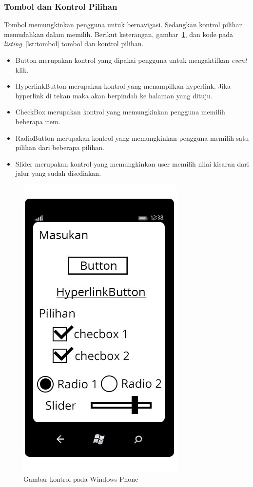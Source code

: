 \subsubsection{Tombol dan Kontrol Pilihan}
\label{subsubsec:Tombol dan Kontrol Pilihan}
\hspace{0.5cm} Tombol memungkinkan pengguna untuk bernavigasi. Sedangkan kontrol pilihan memudahkan dalam memilih. Berikut keterangan, gambar~\ref{fig:kontrol_tombol}, dan kode pada \textit{listing}~\ref{lst:tombol} tombol dan kontrol pilihan.
 
\begin{itemize}
	\item Button merupakan kontrol yang dipakai pengguna untuk mengaktifkan \textit{event} klik.
	\item HyperlinkButton merupakan kontrol yang menampilkan hyperlink. Jika hyperlink di tekan maka akan berpindah ke halaman yang dituju.	
	\item CheckBox merupakan kontrol yang memungkinkan pengguna memilih beberapa item.
	\item RadioButton merupakan kontrol yang memungkinkan pengguna memilih satu pilihan dari beberapa pilihan.
	\item Slider merupakan kontrol yang memungkinkan user memilih nilai kisaran dari jalur yang sudah disediakan.
\end{itemize}

\begin{figure}[h]
	\centering
		\includegraphics[scale=0.5]{Gambar/Tombol/tombol_dan_pilihan}
	\caption{Gambar kontrol pada Windows Phone}
	\label{fig:kontrol_tombol}
\end{figure}

